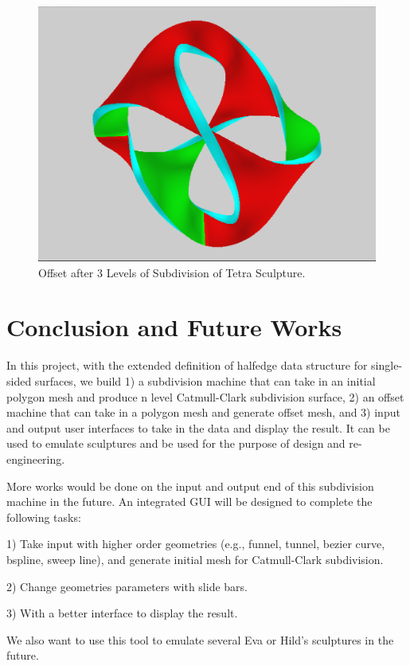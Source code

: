 \documentclass[12pt]{article}
\begin{document}
\begin{figure}[h!]
  \centering
    \includegraphics[width=\textwidth]{TetraOff}
  \caption{Offset after 3 Levels of Subdivision of Tetra Sculpture.} \label{figure:TetraOff}
\end{figure}

\newpage
\section{Conclusion and Future Works}
In this project, with the extended definition of halfedge data structure for single-sided surfaces, we build 1) a subdivision machine that can take in an initial polygon mesh and produce n level Catmull-Clark subdivision surface, 2) an offset machine that can take in a polygon mesh and generate offset mesh, and 3) input and output user interfaces to take in the data and display the result. It can be used to emulate sculptures and be used for the purpose of design and re-engineering.

More works would be done on the input and output end of this subdivision machine in the future. An integrated GUI will be designed to complete the following tasks: 

1) Take input with higher order geometries (e.g., funnel, tunnel, bezier curve, bspline, sweep line), and generate initial mesh for Catmull-Clark subdivision.

2) Change geometries parameters with slide bars.

3) With a better interface to display the result.

We also want to use this tool to emulate several Eva or Hild's sculptures in the future.
\end{document}

